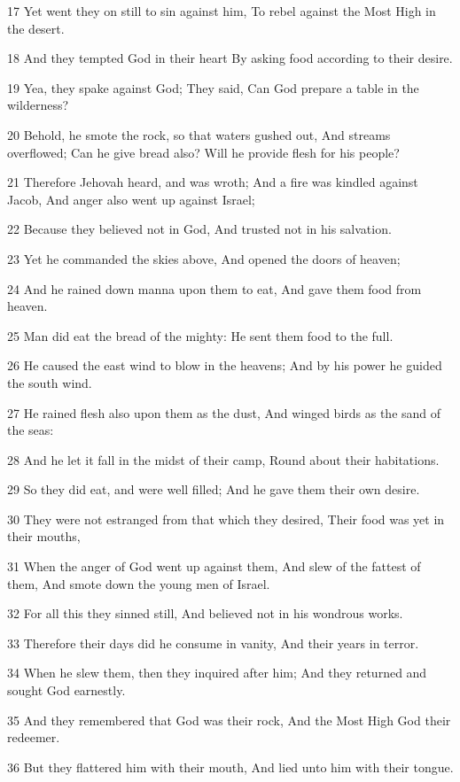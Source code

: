 \par 17 Yet went they on still to sin against him, To rebel against the Most High in the desert.
\par 18 And they tempted God in their heart By asking food according to their desire.
\par 19 Yea, they spake against God; They said, Can God prepare a table in the wilderness?
\par 20 Behold, he smote the rock, so that waters gushed out, And streams overflowed; Can he give bread also? Will he provide flesh for his people?
\par 21 Therefore Jehovah heard, and was wroth; And a fire was kindled against Jacob, And anger also went up against Israel;
\par 22 Because they believed not in God, And trusted not in his salvation.
\par 23 Yet he commanded the skies above, And opened the doors of heaven;
\par 24 And he rained down manna upon them to eat, And gave them food from heaven.
\par 25 Man did eat the bread of the mighty: He sent them food to the full.
\par 26 He caused the east wind to blow in the heavens; And by his power he guided the south wind.
\par 27 He rained flesh also upon them as the dust, And winged birds as the sand of the seas:
\par 28 And he let it fall in the midst of their camp, Round about their habitations.
\par 29 So they did eat, and were well filled; And he gave them their own desire.
\par 30 They were not estranged from that which they desired, Their food was yet in their mouths,
\par 31 When the anger of God went up against them, And slew of the fattest of them, And smote down the young men of Israel.
\par 32 For all this they sinned still, And believed not in his wondrous works.
\par 33 Therefore their days did he consume in vanity, And their years in terror.
\par 34 When he slew them, then they inquired after him; And they returned and sought God earnestly.
\par 35 And they remembered that God was their rock, And the Most High God their redeemer.
\par 36 But they flattered him with their mouth, And lied unto him with their tongue.
